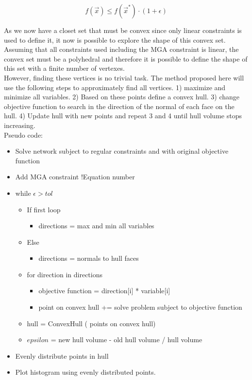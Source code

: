 \begin{equation}\label{eq:MGA_constraint}
	f(\vec{x}) \leqslant f(\vec{x}^*) \cdot (1+\epsilon)
\end{equation}

As we now have a closet set that must be convex since only linear constraints is used to define it, it now is possible to explore the shape of this convex set. Assuming that all constraints used including the MGA constraint is linear, the convex set must be a polyhedral and therefore it is possible to define the shape of this set with a finite number of vertexes. \\

However, finding these vertices is no trivial task. The method proposed here will use the following steps to approximately find all vertices. 1) maximize and minimize all variables. 2) Based on these points define a convex hull. 3) change objective function to search in the direction of the normal of each face on the hull. 4) Update hull with new points and repeat 3 and 4 until hull volume stops increasing. \\

Pseudo code:

\begin{itemize}[label={}]
	\item Solve network subject to regular constraints and with original objective function
	\item Add MGA constraint !Equation number
	\item while $\epsilon>tol$
	\begin{itemize}[label={}]
		\item If first loop
		\begin{itemize}[label={}]
			\item directions = max and min all variables
		\end{itemize}
		\item Else
		\begin{itemize}[label={}]
			\item directions = normals to hull faces
		\end{itemize}
		\item for direction in directions
		\begin{itemize}[label={}]
			\item objective function = direction[i] * variable[i]
			\item point on convex hull += solve problem subject to objective function
		\end{itemize}
		\item hull = ConvexHull ( points on convex hull)
		\item $epsilon$ = new hull volume - old hull volume / hull volume
	\end{itemize}
	\item Evenly distribute points in hull 
	\item Plot histogram using evenly distributed points. 
\end{itemize}














